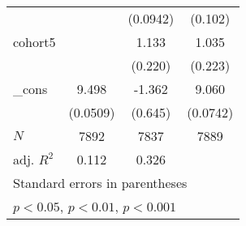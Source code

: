\begin{table}[htbp]
\begin{tabular}{l*{3}{c}}
            &                     &    (0.0942)         &     (0.102)         \\
[1em]
cohort5     &                     &       1.133\sym{***}&       1.035\sym{***}\\
            &                     &     (0.220)         &     (0.223)         \\
[1em]
\_cons      &       9.498\sym{***}&      -1.362\sym{*}  &       9.060\sym{***}\\
            &    (0.0509)         &     (0.645)         &    (0.0742)         \\
\hline
\(N\)       &        7892         &        7837         &        7889         \\
adj. \(R^{2}\)&       0.112         &       0.326         &                     \\
\hline\hline
\multicolumn{4}{l}{\footnotesize Standard errors in parentheses}\\
\multicolumn{4}{l}{\footnotesize \sym{*} \(p<0.05\), \sym{**} \(p<0.01\), \sym{***} \(p<0.001\)}\\
\end{tabular}
\end{table}
